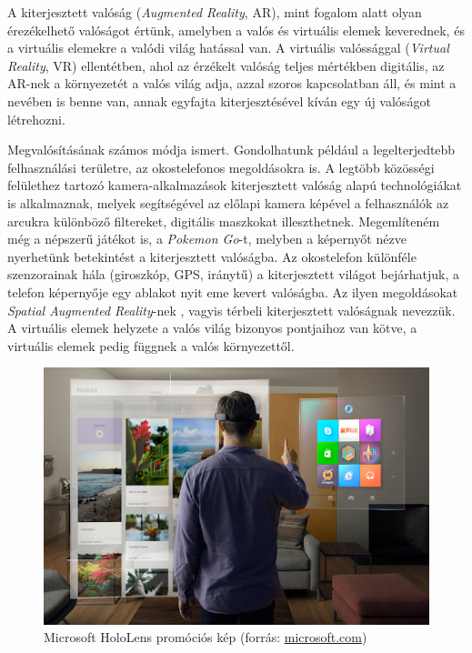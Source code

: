 


A kiterjesztett valóság (\textit{Augmented Reality}, AR), mint fogalom alatt olyan érezékelhető valóságot értünk, amelyben a valós és virtuális elemek keverednek, és a virtuális elemekre a valódi világ hatással van. A virtuális valóssággal (\textit{Virtual Reality}, VR) ellentétben, ahol az érzékelt valóság teljes mértékben digitális, az AR-nek a környezetét a valós világ adja, azzal szoros kapcsolatban áll, és mint a nevében is benne van, annak egyfajta kiterjesztésével kíván egy új valóságot létrehozni.

Megvalósításának számos módja ismert. Gondolhatunk például a legelterjedtebb felhasználási területre, az okostelefonos megoldásokra is. A legtöbb közösségi felülethez tartozó kamera-alkalmazások kiterjesztett valóság alapú technológiákat is alkalmaznak, melyek segítségével az előlapi kamera képével a felhasználók az arcukra különböző filtereket, digitális maszkokat illeszthetnek. Megemlíteném még a népszerű játékot is, a \textit{Pokemon Go}-t, melyben a képernyőt nézve nyerhetünk betekintést a kiterjesztett valóságba. Az okostelefon különféle szenzorainak hála (giroszkóp, GPS, iránytű) a kiterjesztett világot bejárhatjuk, a telefon képernyője egy ablakot nyit eme kevert valóságba. Az ilyen megoldásokat \textit{Spatial Augmented Reality}-nek \cite{bimber2005spatial}, vagyis térbeli kiterjesztett valóságnak nevezzük. A virtuális elemek helyzete a valós világ bizonyos pontjaihoz van kötve, a virtuális elemek pedig függnek a valós környezettől.

\begin{figure}[h]
\centering
\includegraphics[width=10.3truecm, height=6.28truecm]{images/AR-hololens.png}
\caption{Microsoft HoloLens promóciós kép (forrás: \url{microsoft.com})}
\label{fig:hololens}
\end{figure}

